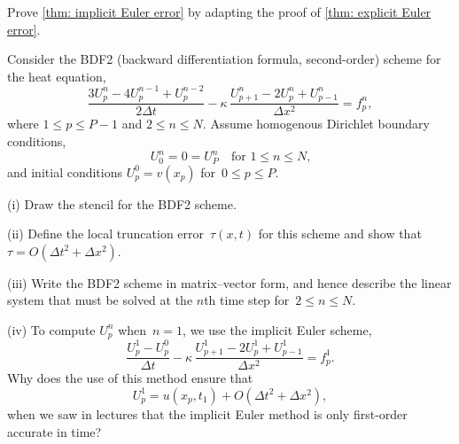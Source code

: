 \begin{Exercises}
\exercise\label{ex: implicit Euler error}
Prove \cref{thm: implicit Euler error} by adapting the proof of 
\cref{thm: explicit Euler error}.

\exercise
Consider the BDF2 (backward differentiation formula, second-order)
scheme for the heat equation,
\[
\frac{3U^n_p-4U^{n-1}_p+U^{n-2}_p}{2\Delta t}
        -\kappa\,\frac{U^n_{p+1}-2U^n_p+U^n_{p-1}}{\Delta x^2}=f^n_p,
\]
where $1\le p\le P-1$ and $2\le n\le N$.  Assume homogenous Dirichlet
boundary conditions,
\[
U^n_0=0=U^n_P\quad\text{for $1\le n\le N$,}
\]
and initial conditions $U^0_p=v(x_p)$ for~$0\le p\le P$.
\begin{description}
\item{(i)} Draw the stencil for the BDF2 scheme.
\item{(ii)} Define the local truncation error~$\tau(x,t)$ for this
scheme and show that $\tau=O(\Delta t^2+\Delta x^2)$.
\item{(iii)} Write the BDF2 scheme in matrix--vector form, and hence
describe the linear system that must be solved at the $n$th time step
for~$2\le n\le N$.
\item{(iv)} To compute $U^n_p$ when~$n=1$, we use the implicit Euler
scheme,
\[
\frac{U^1_p-U^0_p}{\Delta t}
        -\kappa\,\frac{U^1_{p+1}-2U^1_p+U^1_{p-1}}{\Delta x^2}=f^1_p.
\]
Why does the use of this method ensure that
\[
U^1_p=u(x_p,t_1)+O(\Delta t^2+\Delta x^2),
\]
when we saw in lectures that the implicit Euler method is only
first-order accurate in time?  
\end{description}

\end{Exercises}
